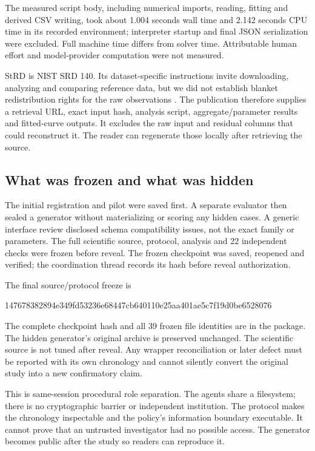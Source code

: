 \documentclass[11pt,letterpaper]{article}
\begin{document}
The measured script body, including numerical imports, reading, fitting and derived CSV writing, took about 1.004 seconds wall time and 2.142 seconds CPU time in its recorded environment; interpreter startup and final JSON serialization were excluded. Full machine time differs from solver time. Attributable human effort and model-provider computation were not measured.

StRD is NIST SRD 140. Its dataset-specific instructions invite downloading, analyzing and comparing reference data, but we did not establish blanket redistribution rights for the raw observations \citep{nistlicense}. The publication therefore supplies a retrieval URL, exact input hash, analysis script, aggregate/parameter results and fitted-curve outputs. It excludes the raw input and residual columns that could reconstruct it. The reader can regenerate those locally after retrieving the source.

\subsection{What was frozen and what was hidden}

The initial registration and pilot were saved first. A separate evaluator then sealed a generator without materializing or scoring any hidden cases. A generic interface review disclosed schema compatibility issues, not the exact family or parameters. The full scientific source, protocol, analysis and 22 independent checks were frozen before reveal. The frozen checkpoint was saved, reopened and verified; the coordination thread records its hash before reveal authorization.

The final source/protocol freeze is
\begin{center}\footnotesize\ttfamily
147678382894e349fd53236e68447cb640110e25aa401ae5c7f19d0be6528076
\end{center}
The complete checkpoint hash and all 39 frozen file identities are in the package. The hidden generator's original archive is preserved unchanged. The scientific source is not tuned after reveal. Any wrapper reconciliation or later defect must be reported with its own chronology and cannot silently convert the original study into a new confirmatory claim.

This is same-session procedural role separation. The agents share a filesystem; there is no cryptographic barrier or independent institution. The protocol makes the chronology inspectable and the policy's information boundary executable. It cannot prove that an untrusted investigator had no possible access. The generator becomes public after the study so readers can reproduce it.
\end{document}
